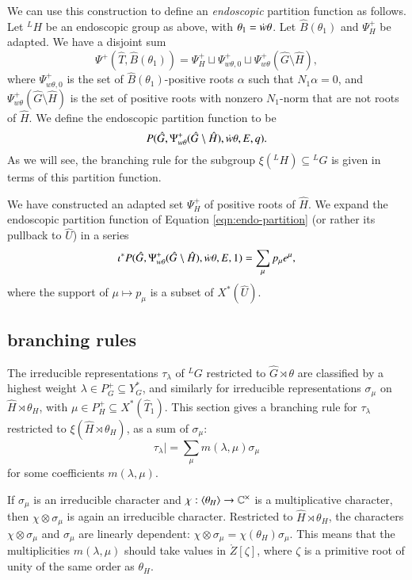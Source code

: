 We can use this construction to define an {\it endoscopic} partition function as follows.
Let ${}^LH$ be an endoscopic group
as above, with $\theta_1 = \dot w \theta$.
Let $\hat B(\theta_1)$ and $\Psi^+_H$ be adapted.  
We have a disjoint sum
\begin{equation}\label{eqn:disj-b1}
\Psi^+(\hat T,\hat B(\theta_1)) = \Psi^+_H \sqcup \Psi_{w\theta,0}^+ \sqcup \Psi_{w\theta}^+(\hat G\setminus\hat H),
\end{equation}
where $\Psi_{w\theta,0}^+$ is the set of $\hat B(\theta_1)$-positive roots $\alpha$ such that $N_1\alpha=0$,
and $\Psi_{w\theta}^+(\hat G\setminus\hat H)$ is the set of positive roots with nonzero $N_1$-norm that are not roots
of $\hat H$.
We define the endoscopic partition function to be
\begin{equation}\label{eqn:endo-partition}
P(\hat G,\Psi_{w\theta}^+(\hat G\setminus\hat H),\dot w\theta,E,q).
\end{equation}
As we will see, the branching rule for the subgroup $\xi({}^LH)\subseteq {}^LG$ is
given in terms of this partition function.

We have constructed an adapted set
$\Psi^+_H$ of positive roots of $\hat H$.  We expand the endoscopic
partition function of Equation \ref{eqn:endo-partition} (or rather its
pullback to $\hat U$) in a series
\begin{equation}
\iota^* P(\hat G,\Psi_{w\theta}^+(\hat G\setminus\hat H),\dot w\theta,E,1) = \sum_{\mu} p_\mu e^\mu,
\end{equation}
where the support of $\mu\mapsto p_\mu$ is a subset of $X^*(\hat U)$. 

\subsection{branching rules}



The irreducible representations $\tau_\lambda$ of ${}^LG$ restricted
to $\hat G\rtimes\theta$ are classified by a highest weight
$\lambda\in P^+_G\subseteq Y^*_G$, and similarly for irreducible
representations $\sigma_\mu$ on $\hat H\rtimes \theta_H$, with $\mu\in
P^+_H\subseteq X^*(\hat T_1)$.
This section gives a branching rule for $\tau_\lambda$ restricted to
$\xi(\hat H\rtimes\theta_H)$, as a sum of $\sigma_\mu$:
\[
\tau_\lambda| = \sum_\mu m(\lambda,\mu) \sigma_\mu
\]
for some coefficients $m(\lambda,\mu)$.  

If $\sigma_\mu$ is an irreducible character and
$\chi:\langle{\theta_H}\rangle\to \mathbb{C}^\times$ is a multiplicative
character, then $ \chi\otimes\sigma_\mu$ is again an irreducible
character.  Restricted to $\hat H\rtimes\theta_H$, the characters
$\chi\otimes\sigma_\mu$ and $\sigma_\mu$ are linearly dependent:
$\chi\otimes\sigma_\mu = \chi(\theta_H) \sigma_\mu $.  This
means that the multiplicities $m(\lambda,\mu)$ should take values in
$\ring{Z}[\zeta]$, where $\zeta$ is a primitive root of unity of the
same order as $\theta_H$.

